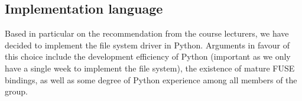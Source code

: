 \documentclass[12pt]{article}
\begin{document}
\subsection{Implementation language}

Based in particular on the recommendation from the course lecturers,
we have decided to implement the file system driver in Python.
Arguments in favour of this choice include the development efficiency
of Python (important as we only have a single week to implement the
file system), the existence of mature FUSE bindings, as well as some
degree of Python experience among all members of the group.



 
\end{document}
